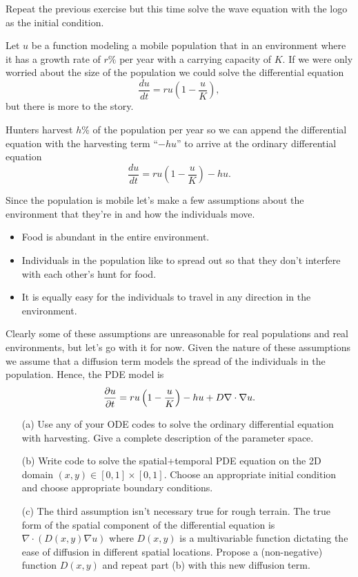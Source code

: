 \begin{problem}
    Repeat the previous exercise but this time solve the wave equation with the logo as the
    initial condition.
\end{problem}




\begin{problem}
    Let $u$ be a function modeling a mobile population that in an environment where it has a growth rate of
    $r\%$ per year with a carrying capacity of $K$.  If we were only worried about the
    size of the population we could solve the differential equation 
    \[ \frac{du}{dt} = ru \left( 1-\frac{u}{K} \right), \]
    but there is more to the story.  
    
    Hunters harvest $h$\% of the population per year so we can append the differential
    equation with the harvesting term ``$-h u$'' to arrive at the ordinary differential
    equation 
    \[ \frac{du}{dt} = ru \left( 1-\frac{u}{K} \right) - hu. \]

    Since the population is mobile let's make a few assumptions about the environment that
    they're in and how the individuals move.
    \begin{itemize}
        \item Food is abundant in the entire environment.
        \item Individuals in the population like to spread out so that they don't
            interfere with each other's hunt for food.
        \item It is equally easy for the individuals to travel in any direction in the
            environment.
    \end{itemize}
    Clearly some of these assumptions are unreasonable for real populations and real
    environments, but let's go with it for now.  Given the nature of these assumptions we
    assume that a diffusion term models the spread of the individuals in the population.
    Hence, the PDE model is
    \[ \frac{\partial{u}}{\partial{t}} = ru\left( 1-\frac{u}{K} \right) - hu + D \nabla \cdot \nabla u. \]
    \begin{enumerate}
        \item[(a)] Use any of your ODE codes to solve the ordinary differential equation
            with harvesting.  Give a complete description of the parameter space.
        \item[(b)] Write code to solve the spatial+temporal PDE equation on the 2D domain
            $(x,y) \in [0,1] \times [0,1]$.  Choose an appropriate initial condition and
            choose appropriate boundary conditions.
        \item[(c)] The third assumption isn't necessary true for rough terrain. The true
            form of the spatial component of the differential equation is $\nabla \cdot
            \left( D(x,y) \nabla u \right)$ where $D(x,y)$ is a multivariable function
            dictating the ease of diffusion in different spatial locations.  Propose a
            (non-negative) function $D(x,y)$ and repeat part (b) with this new diffusion
            term.
    \end{enumerate}
\end{problem}
